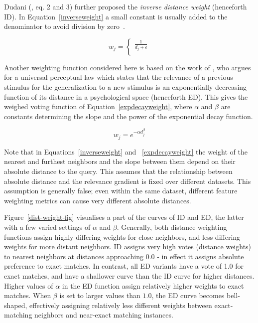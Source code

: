 \documentclass{book}
\begin{document}
Dudani (, eq. 2 and 3) further proposed the {\em inverse
distance weight} (henceforth ID). In Equation~\ref{inverseweight} a
small constant is usually added to the denominator to avoid division
by zero~\cite{Wettschereck94}.

\begin{equation}
\label{inverseweight}
w_{j}= \left \{ \begin{array}{ll}
                        \frac{1}{d_{j} + \epsilon} \\
                    \end{array}
          \right.
\end{equation}

Another weighting function considered here is based on the work of
, who argues for a universal perceptual law which
states that the relevance of a previous stimulus for the
generalization to a new stimulus is an exponentially decreasing
function of its distance in a psychological space (henceforth
ED). This gives the weighed voting function of
Equation~\ref{expdecayweight}, where $\alpha$ and $\beta$ are
constants determining the slope and the power of the exponential decay
function.

\begin{equation}
\label{expdecayweight}
w_{j}= e^{-\alpha d_{j}^\beta}
\end{equation}

Note that in Equations~\ref{inverseweight} and ~\ref{expdecayweight}
the weight of the nearest and furthest neighbors and the slope between
them depend on their absolute distance to the query. This assumes that
the relationship between absolute distance and the relevance gradient
is fixed over different datasets. This assumption is generally false;
even within the same dataset, different feature weighting metrics can
cause very different absolute distances.

Figure~\ref{dist-weight-fig} visualises a part of the curves of ID and
ED, the latter with a few varied settings of $\alpha$ and
$\beta$. Generally, both distance weighting functions assign highly
differing weights for close neighbors, and less differing weights for
more distant neighbors. ID assigns very high votes (distance weights)
to nearest neighbors at distances approaching 0.0 - in effect it
assigns absolute preference to exact matches. In contrast, all ED
variants have a vote of 1.0 for exact matches, and have a shallower
curve than the ID curve for higher distances. Higher values of
$\alpha$ in the ED function assign relatively higher weights to exact
matches. When $\beta$ is set to larger values than $1.0$, the ED curve
becomes bell-shaped, effectively assigning relatively less different
weights between exact-matching neighbors and near-exact matching
instances.
\end{document}
